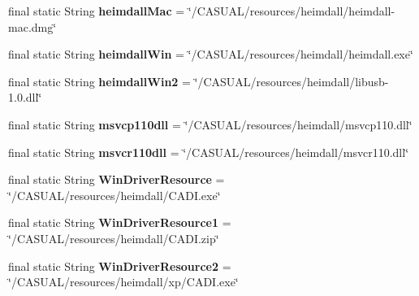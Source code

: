 \begin{DoxyCompactItemize}
\item 
\hypertarget{classCASUAL_1_1Statics_acb74207f9abd8d5c1a28f52f36f78eb4}{final static String {\bfseries heimdall\-Mac} = \char`\"{}/C\-A\-S\-U\-A\-L/resources/heimdall/heimdall-\/mac.\-dmg\char`\"{}}\label{classCASUAL_1_1Statics_acb74207f9abd8d5c1a28f52f36f78eb4}

\item 
\hypertarget{classCASUAL_1_1Statics_a68358f3221cb39efb02e2a2ada2bed8c}{final static String {\bfseries heimdall\-Win} = \char`\"{}/C\-A\-S\-U\-A\-L/resources/heimdall/heimdall.\-exe\char`\"{}}\label{classCASUAL_1_1Statics_a68358f3221cb39efb02e2a2ada2bed8c}

\item 
\hypertarget{classCASUAL_1_1Statics_a9b258df85f285e07b884e31477ee7ca6}{final static String {\bfseries heimdall\-Win2} = \char`\"{}/C\-A\-S\-U\-A\-L/resources/heimdall/libusb-\/1.\-0.dll\char`\"{}}\label{classCASUAL_1_1Statics_a9b258df85f285e07b884e31477ee7ca6}

\item 
\hypertarget{classCASUAL_1_1Statics_aa0d6427868b4cc0d828445680ef73a13}{final static String {\bfseries msvcp110dll} = \char`\"{}/C\-A\-S\-U\-A\-L/resources/heimdall/msvcp110.\-dll\char`\"{}}\label{classCASUAL_1_1Statics_aa0d6427868b4cc0d828445680ef73a13}

\item 
\hypertarget{classCASUAL_1_1Statics_aedb3bf7bbeb8b7efc8a88cff12e9decb}{final static String {\bfseries msvcr110dll} = \char`\"{}/C\-A\-S\-U\-A\-L/resources/heimdall/msvcr110.\-dll\char`\"{}}\label{classCASUAL_1_1Statics_aedb3bf7bbeb8b7efc8a88cff12e9decb}

\item 
\hypertarget{classCASUAL_1_1Statics_a3c451fca59150dfb31ad18628c9bdc70}{final static String {\bfseries Win\-Driver\-Resource} = \char`\"{}/C\-A\-S\-U\-A\-L/resources/heimdall/C\-A\-D\-I.\-exe\char`\"{}}\label{classCASUAL_1_1Statics_a3c451fca59150dfb31ad18628c9bdc70}

\item 
\hypertarget{classCASUAL_1_1Statics_a3353b8778aac0a666d6118a8111d8c76}{final static String {\bfseries Win\-Driver\-Resource1} = \char`\"{}/C\-A\-S\-U\-A\-L/resources/heimdall/C\-A\-D\-I.\-zip\char`\"{}}\label{classCASUAL_1_1Statics_a3353b8778aac0a666d6118a8111d8c76}

\item 
\hypertarget{classCASUAL_1_1Statics_a77b2c9513ebdb50411cddc48980b42a4}{final static String {\bfseries Win\-Driver\-Resource2} = \char`\"{}/C\-A\-S\-U\-A\-L/resources/heimdall/xp/C\-A\-D\-I.\-exe\char`\"{}}\label{classCASUAL_1_1Statics_a77b2c9513ebdb50411cddc48980b42a4}


\end{DoxyCompactItemize}
